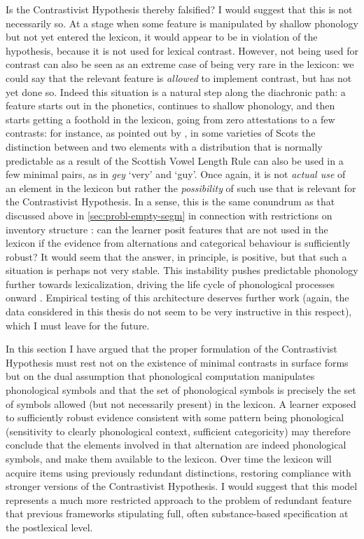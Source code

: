 Is the Contrastivist Hypothesis thereby falsified? I would suggest that this is not necessarily so. At a stage when some feature is manipulated by shallow phonology but not yet entered the lexicon, it would appear to be in violation of the hypothesis, because it is not used for lexical contrast. However, not being used for contrast can also be seen as an extreme case of being very rare in the lexicon: we could say that the relevant feature is \emph{allowed} to implement contrast, but has not yet done so. Indeed this situation is a natural step along the diachronic path: a feature starts out in the phonetics, continues to shallow phonology, and then starts getting a foothold in the lexicon, going from zero attestations to a few contrasts: for instance, as pointed out by \citet{scobbie08:_quasi}, in some varieties of Scots the distinction between \ipa{[ʌɪ]} and \ipa{[ɑe]}\dash two elements with a distribution that is normally predictable as a result of the Scottish Vowel Length Rule \citep[\cfm][]{scobbie99:_stand_englis_edinb_glasg,mcmahon00:_lexic_phonol_englis}\dash can also be used in a few minimal pairs, as in \emph{gey} \ipa{[ˈɡʌɪ]} `very' and \ipa{[ˈɡɑe]} `guy'. Once again, it is not \emph{actual use} of an element in the lexicon but rather the \emph{possibility} of such use that is relevant for the Contrastivist Hypothesis. In a sense, this is the same conundrum as that discussed above in \cref{sec:probl-empty-segm} in connection with restrictions on inventory structure \citep{blaho-diss,kramer09:_italian}: can the learner posit features that are not used in the lexicon if the evidence from alternations and categorical behaviour is sufficiently robust? It would seem that the answer, in principle, is positive, but that such a situation is perhaps not very stable. This instability pushes predictable phonology further towards lexicalization, driving the life cycle of phonological processes onward \citep{bermudez-diachr,kaisse11:_lexic_phonol}. Empirical testing of this architecture deserves further work (again, the data considered  in this thesis do not seem to be very instructive in this respect), which I must leave for the future.

In this section I have argued that the proper formulation of the Contrastivist Hypothesis must rest not on the existence of minimal contrasts in surface forms but on the dual assumption that phonological computation manipulates phonological symbols and that the set of phonological symbols is precisely the set of symbols allowed (but not necessarily present) in the lexicon. A learner exposed to sufficiently robust evidence consistent with some pattern being phonological (\eg sensitivity to clearly phonological context, sufficient categoricity) may therefore conclude that the elements involved in that alternation are indeed phonological symbols, and make them available to the lexicon. Over time the lexicon will acquire items using previously redundant distinctions, restoring compliance with stronger versions of the Contrastivist Hypothesis. I would suggest that this model represents a much more restricted approach to the problem of redundant feature that previous frameworks stipulating full, often substance\hyp based specification at the postlexical level.

